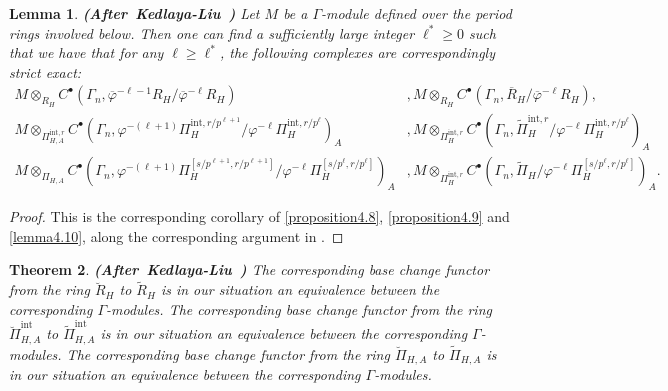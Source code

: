 \documentclass[12pt]{amsart}
\newtheorem{theorem}{Theorem}[section]
\newtheorem{lemma}[theorem]{Lemma}
\theoremstyle{definition}
\numberwithin{equation}{section}
\begin{document}
\begin{lemma} \mbox{\bf{(After Kedlaya-Liu \cite[Lemma 5.6.6]{KL16})}} \label{lemma4.11}
Let $M$ be a $\Gamma$-module defined over the period rings involved below. Then one can find a sufficiently large integer $\ell^*\geq 0$ such that we have that for any $\ell\geq \ell^*$, the following complexes are correspondingly strict exact: 
\begin{align}
M\otimes_{R_H} C^\bullet(\Gamma_n,\overline{\varphi}^{-\ell-1}R_H/\overline{\varphi}^{-\ell}R_H)&, M\otimes_{R_H} C^\bullet(\Gamma_n,\overline{R}_H/\overline{\varphi}^{-\ell}R_H),\\
M\otimes_{\Pi^{\mathrm{int},r}_{H,A}} C^\bullet(\Gamma_n,\varphi^{-(\ell+1)}\Pi^{\mathrm{int},r/p^{\ell+1}}_{H}/\varphi^{-\ell}\Pi^{\mathrm{int},r/p^\ell}_{H})_A&, M\otimes_{\Pi^{\mathrm{int},r}_{H}} C^\bullet(\Gamma_n,\widetilde{\Pi}^{\mathrm{int},r}_{H}/\varphi^{-\ell}\Pi^{\mathrm{int},r/p^\ell}_{H})_A\\ 
M\otimes_{\Pi_{H,A}} C^\bullet(\Gamma_n,\varphi^{-(\ell+1)}\Pi^{[s/p^{\ell+1},r/p^{\ell+1}]}_{H}/\varphi^{-\ell}\Pi^{[s/p^{\ell},r/p^{\ell}]}_{H})_A&, M\otimes_{\Pi^{\mathrm{int},r}_{H}} C^\bullet(\Gamma_n,\widetilde{\Pi}_{H}/\varphi^{-\ell}\Pi^{[s/p^{\ell},r/p^{\ell}]}_{H})_A.
\end{align}	



\end{lemma}
	


\begin{proof}
This is the corresponding corollary of \cref{proposition4.8}, \cref{proposition4.9} and \cref{lemma4.10}, along the corresponding argument in \cite[Lemma 5.6.6]{KL16}. 	
\end{proof}




\begin{theorem}\mbox{\bf{(After Kedlaya-Liu \cite[Lemma 5.6.9]{KL16})}} \label{theorem4.12}
The corresponding base change functor from the ring $\breve{R}_H$ to $\widetilde{R}_H$ is in our situation an equivalence between the corresponding $\Gamma$-modules.	 The corresponding base change functor from the ring $\breve{\Pi}^{\mathrm{int}}_{H,A}$ to $\widetilde{\Pi}^\mathrm{int}_{H,A}$ is in our situation an equivalence between the corresponding $\Gamma$-modules. The corresponding base change functor from the ring $\breve{\Pi}_{H,A}$ to $\widetilde{\Pi}_{H,A}$ is in our situation an equivalence between the corresponding $\Gamma$-modules.
\end{theorem}
\end{document}
